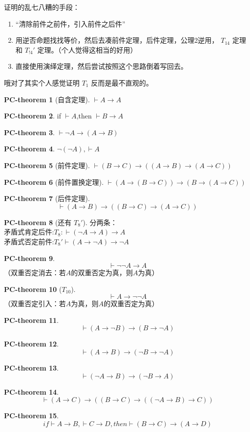\documentclass[oneside]{book}
\theoremstyle{definition}
\newtheorem{pct}{PC-theorem}
\begin{document}
证明的乱七八糟的手段：
\begin{enumerate}
	\item “清除前件之前件，引入前件之后件”
	\item 用逆否命题找找等价，然后去凑前件定理，后件定理，公理2逆用， \(T_{14}\) 定理和 \(T_{!4}'\) 定理。（个人觉得这相当的好用）
	\item 直接使用演绎定理，然后尝试按照这个思路倒着写回去。
\end{enumerate}
哦对了其实个人感觉证明 \(T_1\) 反而是最不直观的。
\begin{pct}[自含定理]
	\( \vdash A \to A \)
\end{pct}
\begin{pct}
	if $\vdash A$,then $\vdash B \to A$
\end{pct}
\begin{pct}
	$\vdash \neg A \to (A \to B)$
\end{pct}
\begin{pct}
	$ \neg(\neg A) ,\vdash A$
\end{pct}
\begin{pct}[前件定理]
	$\vdash (B \to C) \to ((A \to B) \to (A \to C))$
\end{pct}
\begin{pct}[前件置换定理]
	$\vdash (A \to (B \to C)) \to (B \to (A \to C))$
\end{pct}
\begin{pct}[后件定理]
	\[
	\vdash (A \to B) \to ((B \to C) \to (A \to C))
	\]
\end{pct}
\begin{pct}[还有 \(T_8'\)]分两条：\\
	矛盾式肯定后件:\(T_8:\vdash (\neg A \to A) \to A\)\\
	矛盾式否定前件:\(T_8'\vdash (A \to \neg A) \to \neg A\)
\end{pct}
\begin{pct}
	\[
	\vdash \neg \neg A \to A
	\]
	（双重否定消去：若$A$的双重否定为真，则$A$为真）
\end{pct}


\begin{pct}[\(T_{10}\)]
	\[
	\vdash A \to \neg \neg A
	\]
	（双重否定引入：若$A$为真，则$A$的双重否定为真）
\end{pct}
\begin{pct}
	\[
	\vdash (A \to \neg B) \to (B \to \neg A)
	\]
\end{pct}
\begin{pct}
	\[
	\vdash (A \to B) \to (\neg B \to \neg A)
	\]
\end{pct}
\begin{pct}
	\[
	\vdash (\neg A \to B) \to (\neg B \to A)
	\]
\end{pct}
\begin{pct}
	\[
	\vdash (A \to C) \to \left( (B \to C) \to ((\neg A \to B) \to C) \right)
	\]
\end{pct}
\begin{pct}
	\[
	if \vdash A \to B,\vdash C \to D,then\vdash (B \to C) \to (A \to D)
	\]
\end{pct}
\end{document}
